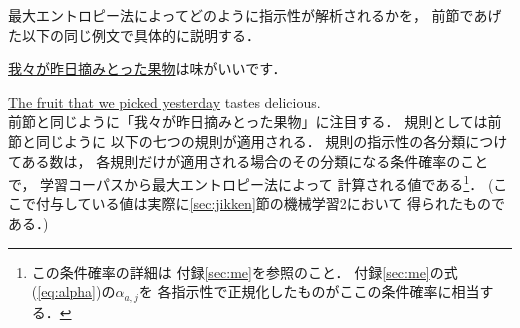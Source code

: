 最大エントロピー法によってどのように指示性が解析されるかを，
前節であげた以下の同じ例文で具体的に説明する．

\begin{description}
\item \underline{我々が昨日摘みとった果物}は味がいいです．
\end{description}
\underline{The fruit that we picked yesterday} tastes delicious.\\

前節と同じように「我々が昨日摘みとった果物」に注目する．
規則としては前節と同じように
以下の七つの規則が適用される．
規則の指示性の各分類につけてある数は，
各規則だけが適用される場合のその分類になる条件確率のことで，
学習コーパスから最大エントロピー法によって
計算される値である\footnote{この条件確率の詳細は
付録\ref{sec:me}を参照のこと．
付録\ref{sec:me}の式(\ref{eq:alpha})の$\alpha_{a,j}$を
各指示性で正規化したものがここの条件確率に相当する．}．
(ここで付与している値は実際に\ref{sec:jikken}節の機械学習2において
得られたものである．)

